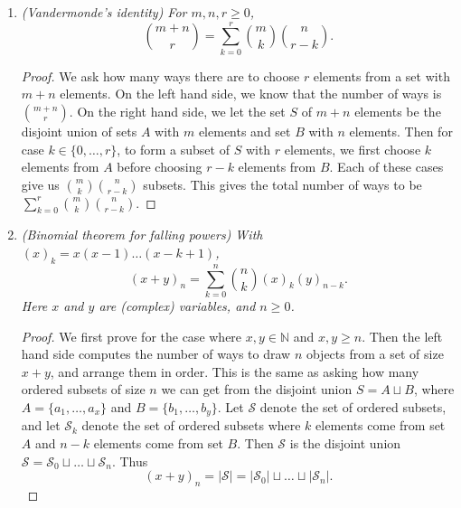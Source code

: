 \documentclass{article}
\begin{document}
\begin{enumerate}[label={\bf Q\arabic*:}]
  \item \it (Vandermonde's identity) For $m,n,r\geq0$,
    \[\binom{m+n}{r} =\sum_{k=0}^r\binom{m}{k}\binom{n}{r-k}.\]

    \begin{proof}
      We ask how many ways there are to choose $r$ elements from a set with
      $m+n$ elements. On the left hand side, we know that the number of
      ways is $\binom{m+n}{r}$. On the right hand side, we let the set $S$ of
      $m+n$ elements be the disjoint union of sets $A$ with $m$ elements
      and set $B$ with $n$ elements. Then for case $k\in\{0,\ldots,r\}$, to
      form a subset of $S$ with $r$ elements, we first choose $k$ elements
      from $A$ before choosing $r-k$ elements from $B$. Each of these cases
      give us $\binom{m}{k}\binom{n}{r-k}$ subsets. This gives the total
      number of ways to be $\sum_{k=0}^r\binom{m}{k}\binom{n}{r-k}$.
    \end{proof}

  \item \it (Binomial theorem for falling powers) With
    $(x)_k=x(x-1)\ldots(x-k+1)$,
    \[(x+y)_n =\sum_{k=0}^n\binom{n}{k}(x)_k(y)_{n-k}.\]
    Here $x$ and $y$ are (complex) variables, and $n\geq0$.

    \begin{proof}
      We first prove for the case where $x,y\in\mathbb{N}$ and $x,y\geq n$.
      Then the left hand side computes the number of ways to draw $n$
      objects from a set of size $x+y$, and arrange them in order. This is
      the same as asking how many ordered subsets of size $n$ we can get
      from the disjoint union $S=A\sqcup B$, where $A=\{a_1,\ldots,a_x\}$
      and $B=\{b_1,\ldots,b_y\}$. Let $\mathcal{S}$ denote the set of
      ordered subsets, and let $\mathcal{S}_k$ denote the set of ordered
      subsets where $k$ elements come from set $A$ and $n-k$ elements come
      from set $B$. Then $\mathcal{S}$ is the disjoint union
      $\mathcal{S}=\mathcal{S}_0\sqcup\ldots\sqcup\mathcal{S}_n$. Thus
      \[(x+y)_n =|\mathcal{S}|
      =|\mathcal{S}_0|\sqcup\ldots\sqcup|\mathcal{S}_n|.\]


\end{proof}
\end{enumerate}
\end{document}
